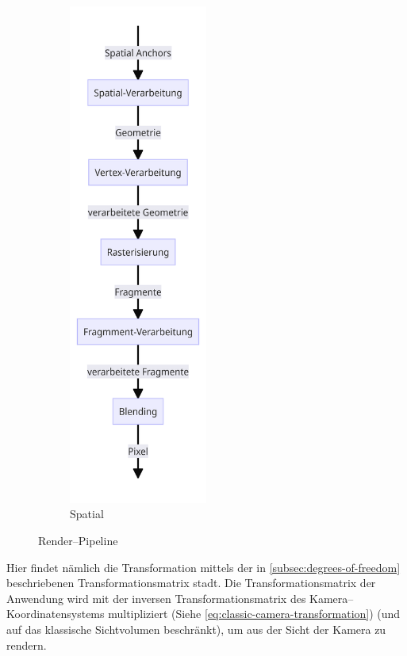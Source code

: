 \begin{figure}[ht!]
\begin{subfigure}{0.5\textwidth}
            \includegraphics[width=0.5\textwidth]{../assets/img/spatial_render_pipline}
            \caption{Spatial}
            \label{subfig:render-pipeline-spatial}
        \end{subfigure}
        \caption{Render--Pipeline}
        \label{fig:render-pipeline}
    \end{figure}

    Hier findet nämlich die Transformation mittels der in \autoref{subsec:degrees-of-freedom} beschriebenen Transformationsmatrix stadt.
    Die Transformationsmatrix der Anwendung wird mit der inversen Transformationsmatrix des Kamera--Koordinatensystems multipliziert (Siehe \autoref{eq:classic-camera-transformation}) (und auf das klassische Sichtvolumen beschränkt), um aus der Sicht der Kamera zu rendern.


